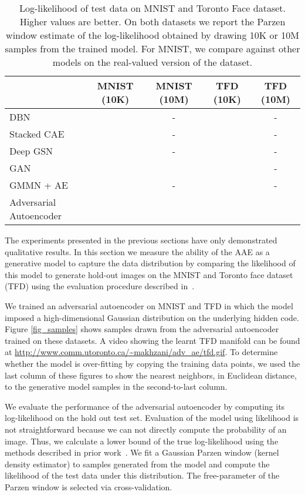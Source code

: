 \documentclass{article}
\begin{document}
\begin{center}
\begin{table}[t]
\small
\centering \begin{tabular}{ l  || c || c || c || c}
  \hline
  & MNIST (10K) & MNIST (10M) & TFD (10K) & TFD (10M)\\
  \hline

  DBN \citep{geoff} &  & - &  & -\\
  Stacked CAE \citep{stacked_cae} &  & - &  & -  \\
  Deep GSN \citep{gsn} &  & - &  & - \\
  GAN \citep{gan} &  &  &  & -\\
  GMMN + AE \citep{gmmn} &  & - &  & -\\
  Adversarial Autoencoder &  &  &  & \\
  \hline
\end{tabular}
\caption{\label{table:table_mnist}Log-likelihood of test data on MNIST and Toronto Face dataset. Higher values are better. On both datasets we report the Parzen window estimate of the log-likelihood obtained by drawing 10K or 10M samples from the trained model. For MNIST, we compare against other models on the real-valued version of the dataset.}
\end{table}
\end{center}

The experiments presented in the previous sections have only demonstrated qualitative results.
In this section we measure the ability of the AAE as a generative model to capture the data distribution by comparing the likelihood of this model to generate hold-out images on the MNIST and Toronto face dataset (TFD) using the evaluation procedure described in~\citep{gan}.

We trained an adversarial autoencoder on MNIST and TFD in which the model imposed a high-dimensional Gaussian distribution on the underlying hidden code.
Figure \ref{fig_samples} shows samples drawn from the adversarial autoencoder trained on these datasets. 
A video showing the learnt TFD manifold can be found at \url{http://www.comm.utoronto.ca/~makhzani/adv_ae/tfd.gif}. 
To determine whether the model is over-fitting by copying the training data points, we used the last column of these figures to show the nearest neighbors, in Euclidean distance, to the generative model samples in the second-to-last column.

We evaluate the performance of the adversarial autoencoder by computing its log-likelihood on the hold out test set. Evaluation of the model using likelihood is not straightforward because we can not directly compute the probability of an image.
Thus, we calculate a lower bound of the true log-likelihood using the methods described in prior work~\citep{stacked_cae,gsn,gan}.
We fit a Gaussian Parzen window (kernel density estimator) to  samples generated from the model and compute the likelihood of the test data under this distribution.
The free-parameter  of the Parzen window is selected via cross-validation.
\end{document}
